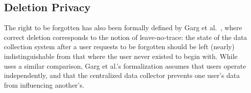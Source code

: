 %
%

%
%


\subsection{Deletion Privacy}
The right to be forgotten has also been formally defined by Garg et
al.~\cite{garg}, where correct deletion corresponds to the notion of
leave-no-trace: the state of the data collection system after a user requests to be forgotten should
be left (nearly) indistinguishable from that where the user never existed to begin with. While
\sys{} uses a similar comparison, Garg et al.'s formalization assumes that users operate
independently, and that the centralized data collector prevents one user's data from influencing
another's.

